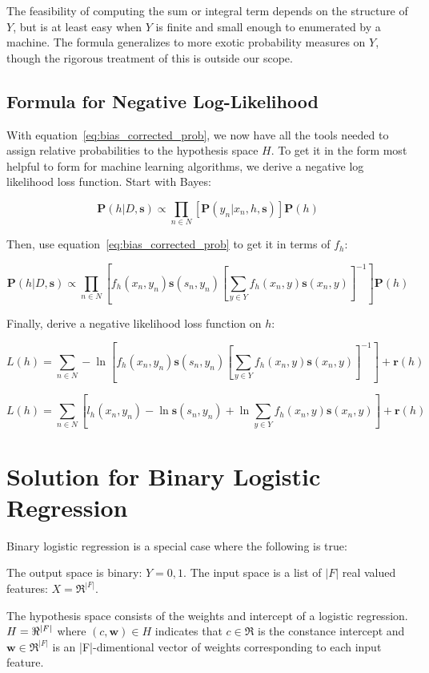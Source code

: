 \documentclass[twoside]{article}
\begin{document}
The feasibility of computing the sum or integral term depends on the structure of \(Y\), but is at least easy when \(Y\) is finite and small enough to enumerated by a machine. The formula generalizes to more exotic probability measures on \(Y\), though the rigorous treatment of this is outside our scope.

\subsection{Formula for Negative Log-Likelihood}

With equation~\eqref{eq:bias_corrected_prob}, we now have all the tools needed to assign relative probabilities to the hypothesis space \(H\). To get it in the form most helpful to form for machine learning algorithms, we derive a negative log likelihood loss function. Start with Bayes:

\[\mathbf{P}(h|D,\mathbf{s})\propto\prod_{n \in N} \left[\mathbf{P}(y_n|x_n,h,\mathbf{s})\right]\mathbf{P}(h)\]

Then, use equation~\eqref{eq:bias_corrected_prob} to get it in terms of \(f_h\):

\[\mathbf{P}(h|D,\mathbf{s})\propto\prod_{n \in N} \left[f_h(x_n,y_n)\mathbf{s}(s_n,y_n)\left [\sum_{y \in Y}f_h(x_n,y)\mathbf{s}(x_n,y) \right ]^{-1} \right]\mathbf{P}(h)\]

Finally, derive a negative likelihood loss function on \(h\):

\[L(h)= \sum_{n \in N} -\ln\left[f_h(x_n,y_n)\mathbf{s}(s_n,y_n)\left [\sum_{y \in Y}f_h(x_n,y)\mathbf{s}(x_n,y) \right ]^{-1} \right] +\mathbf{r}(h)\]

\[L(h)= \sum_{n \in N} \left[l_h(x_n,y_n)-\ln\mathbf{s}(s_n,y_n)+\ln\sum_{y \in Y}f_h(x_n,y)\mathbf{s}(x_n,y) \right] +\mathbf{r}(h)\]

\section{Solution for Binary Logistic Regression}

Binary logistic regression is a special case where the following is true:

The output space is binary: \(Y = {0, 1}\).
The input space is a list of \(|F|\) real valued features: \(X = \Re ^{|F|}\).

The hypothesis space consists of the weights and intercept of a logistic regression. \(H=\Re \time \Re ^{|F|}\)  where  \((c, \mathbf{w}) \in H\) indicates that \(c \in \Re\) is the constance intercept and \(\mathbf{w} \in \Re ^{|F|}\) is an |F|-dimentional vector of weights corresponding to each input feature.
\end{document}
